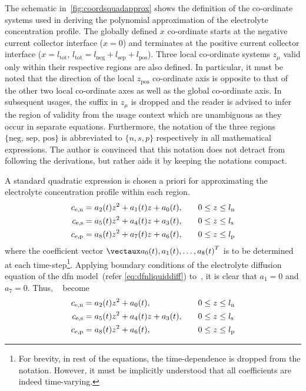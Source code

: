 The  schematic  in~\cref{fig:coordsquadapprox}  shows   the  definition  of  the
co-ordinate  systems  used  in  deriving the  polynomial  approximation  of  the
electrolyte concentration  profile. The globally defined  $x$ co-ordinate starts
at  the negative  current  collector  interface ($x=0$)  and  terminates at  the
positive  current  collector  interface  ($x =  l_\text{tot},\,  l_\text{tot}  =
l_\text{neg} +  l_\text{sep} +  l_\text{pos}$). Three local  co-ordinate systems
$z_\mu$  valid  only  within  their  respective regions  are  also  defined.  In
particular, it  must be  noted that  the direction  of the  local $z_\text{pos}$
co-ordinate axis is opposite to that of  the other two local co-ordinate axes as
well as the global co-ordinate axis. In subsequent usages, the suffix in $z_\mu$
is dropped and  the reader is advised  to infer the region of  validity from the
usage  context  which are  unambiguous  as  they  occur in  separate  equations.
Furthermore, the  notation of  the three regions  $\{\text{neg, sep,  pos}\}$ is
abbreviated  to $\{n,s,p\}$  respectively in  all mathematical  expressions. The
author  is convinced  that this  notation does  not detract  from following  the
derivations, but rather aids it by keeping the notations compact.

A  standard  quadratic expression  is  chosen  a  priori for  approximating  the
electrolyte concentration profile within each region.
\begin{alignat}{2}
    c_{\text{e,n}} &= a_2(t) z^2 + a_1(t) z + a_0(t),\quad &&0 \le z \le l_\text{n}\label{eq:cenquadstart} \\
    c_{\text{e,s}} &= a_5(t) z^2 + a_4(t) z + a_3(t),\quad &&0 \le z \le l_\text{s}\label{eq:cesquadstart} \\
    c_{\text{e,p}} &= a_8(t) z^2 + a_7(t) z + a_6(t),\quad &&0 \le z \le l_\text{p}\label{eq:cepquadstart}
\end{alignat}
where  the  coefficient  vector  $\vect{a_0(t),a_1(t),  \dots  ,a_8(t)}$  is  to
be   determined   at   each   time-step\footnote{For   brevity,   in   rest   of
the   equations,   the   time-dependence   is   dropped   from   the   notation.
However,  it   must  be   implicitly  understood   that  all   coefficients  are
indeed  time-varying.}.   Applying  boundary   conditions  of   the  electrolyte
diffusion  equation  of   the  \gls{dfn}  model~(refer  \cref{eq:dfnliquiddiff})
to~, it is clear  that $a_1 = 0$ and
$a_7 = 0$. Thus, ~ become
\begin{alignat}{2}
    c_{\text{e,n}} &= a_2(t) z^2 + a_0(t),\quad &&0 \le z \le l_\text{n}\label{eq:cenquadreduced} \\
    c_{\text{e,s}} &= a_5(t) z^2 + a_4(t) z + a_3(t),\quad &&0 \le z \le l_\text{s}\label{eq:cesquadreduced} \\
    c_{\text{e,p}} &= a_8(t) z^2 + a_6(t),\quad &&0 \le z \le l_\text{p}\label{eq:cepquadreduced}
\end{alignat}

